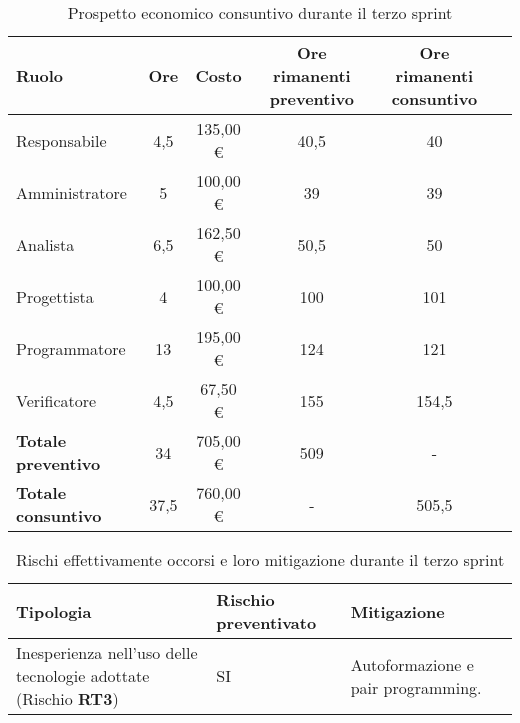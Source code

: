 \begin{table}[!h]
    \centering
    \begin{tabular}{ | l | c | c | c | c | c | }
        \hline
        \textbf{Ruolo} & \textbf{Ore} & \textbf{Costo} & \textbf{Ore rimanenti preventivo} & \textbf{Ore rimanenti consuntivo} \\
        \hline
        Responsabile               &  4,5 &  135,00 € &  40,5 &  40   \\
        Amministratore             &  5   &  100,00 € &  39   &  39   \\
        Analista                   &  6,5 &  162,50 € &  50,5 &  50   \\
        Progettista                &  4   &  100,00 € & 100   & 101   \\
        Programmatore              & 13   &  195,00 € & 124   & 121   \\
        Verificatore               &  4,5 &   67,50 € & 155   & 154,5 \\
        \hline
        \textbf{Totale preventivo} & 34   &  705,00 € & 509   &   -   \\
        \hline
        \textbf{Totale consuntivo} & 37,5 &  760,00 € &   -   & 505,5 \\
        \hline
    \end{tabular}
    \caption{Prospetto economico consuntivo durante il terzo sprint}
    \label{tab:23}
\end{table}

\begin{table}[!h]
    \centering
    \begin{tabular}{ | p{6cm} | p{2.5cm} | p{7.5cm} | }
        \hline
        \textbf{Tipologia} & \textbf{Rischio preventivato} & \textbf{Mitigazione}  \\
        \hline
        Inesperienza nell'uso delle tecnologie adottate (Rischio \textbf{RT3}) & SI & Autoformazione e pair programming.\\
        \hline
    \end{tabular}
    \caption{Rischi effettivamente occorsi e loro mitigazione durante il terzo sprint}
    \label{tab:24}
\end{table}

